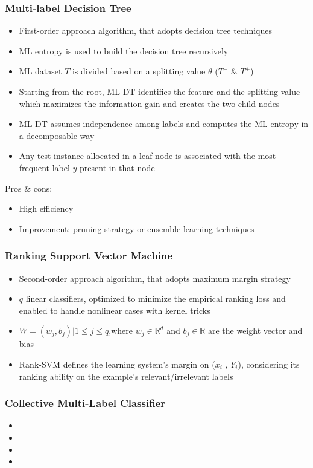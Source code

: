 \documentclass{beamer}
\begin{document}
\begin{frame}
\frametitle{Multi-label Decision Tree}
\begin{itemize}
	\item First-order approach algorithm, that adopts decision tree techniques
	\item ML entropy is used to
build the decision tree recursively
	\item ML dataset $T$ is divided based on a splitting value $\theta$ ($T^-$ \& $T^+$)
	\item Starting from the root, ML-DT identifies the feature and the splitting value which
maximizes the information gain and creates the two child nodes
	\item ML-DT assumes independence among labels and computes the ML
entropy in a decomposable way
	\item Any test instance allocated in a leaf node is associated with the most frequent label $y$ present in that node
\end{itemize}
Pros \& cons:
\begin{itemize}
	\item High efficiency
	\item Improvement: pruning strategy  or ensemble learning techniques
\end{itemize}
\end{frame}
\begin{frame}
\frametitle{Ranking Support Vector Machine}
\begin{itemize}
	\item Second-order approach algorithm, that adopts maximum margin strategy 
	\item $q$ linear classifiers, optimized to minimize the empirical
ranking loss and enabled to handle nonlinear cases with kernel tricks 
	\item $W = {(w_j , b_j ) | 1 ≤ j ≤ q}$,where $w_j \in \mathbb{R}^d$ and
$b_j \in \mathbb{R}$ are the weight vector and bias
	\item Rank-SVM defines the learning system's
margin on ($x_i$ , $Y_i$), considering its ranking ability on the example’s relevant/irrelevant labels
\end{itemize}
\end{frame}
\begin{frame}
\frametitle{Collective Multi-Label Classifier}
\begin{itemize}
	\item 
	\item 
	\item 
	\item 
\end{itemize}
\end{frame}
\end{document}
